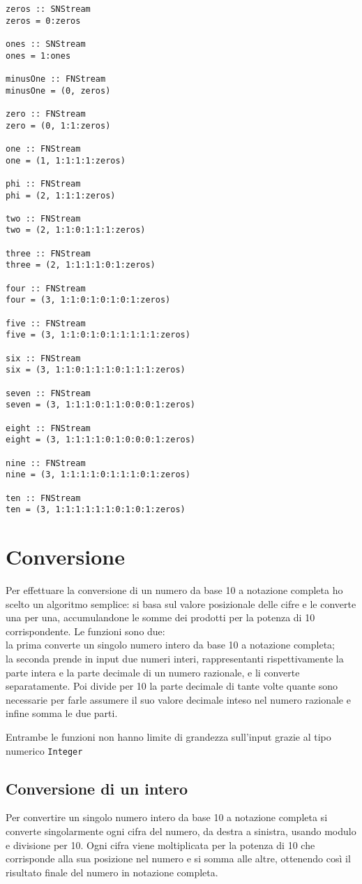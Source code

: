 \documentclass[Lau,oneside]{sapthesis}
\newcommand{\code}[1]{\colorbox{light-gray}{\texttt{#1}}}
\begin{document}
\begin{verbatim}
zeros :: SNStream
zeros = 0:zeros

ones :: SNStream
ones = 1:ones

minusOne :: FNStream
minusOne = (0, zeros)

zero :: FNStream
zero = (0, 1:1:zeros)

one :: FNStream
one = (1, 1:1:1:1:zeros)

phi :: FNStream
phi = (2, 1:1:1:zeros)

two :: FNStream
two = (2, 1:1:0:1:1:1:zeros)

three :: FNStream
three = (2, 1:1:1:1:0:1:zeros)

four :: FNStream
four = (3, 1:1:0:1:0:1:0:1:zeros)

five :: FNStream
five = (3, 1:1:0:1:0:1:1:1:1:1:zeros)

six :: FNStream
six = (3, 1:1:0:1:1:1:0:1:1:1:zeros)

seven :: FNStream
seven = (3, 1:1:1:0:1:1:0:0:0:1:zeros)

eight :: FNStream
eight = (3, 1:1:1:1:0:1:0:0:0:1:zeros)

nine :: FNStream
nine = (3, 1:1:1:1:0:1:1:1:0:1:zeros)

ten :: FNStream
ten = (3, 1:1:1:1:1:1:0:1:0:1:zeros)
\end{verbatim}


\section{Conversione}
Per effettuare la conversione di un numero da base 10 a notazione completa ho scelto un algoritmo semplice: si basa sul valore posizionale delle cifre e le converte una per una, accumulandone le somme dei prodotti per la potenza di 10 corrispondente. Le funzioni sono due:\\
la prima converte un singolo numero intero da base 10 a notazione completa;\\
la seconda prende in input due numeri interi, rappresentanti rispettivamente la parte intera e la parte decimale di un numero razionale, e li converte separatamente. Poi divide per 10 la parte decimale di tante volte quante sono necessarie per farle assumere il suo valore decimale inteso nel numero razionale e infine somma le due parti.

Entrambe le funzioni non hanno limite di grandezza sull'input grazie al tipo numerico \code{Integer}


\subsection{Conversione di un intero}
Per convertire un singolo numero intero da base 10 a notazione completa si converte singolarmente ogni cifra del numero, da destra a sinistra, usando modulo e divisione per 10. Ogni cifra viene moltiplicata per la potenza di 10 che corrisponde alla sua posizione nel numero e si somma alle altre, ottenendo così il risultato finale del numero in notazione completa.
\end{document}
